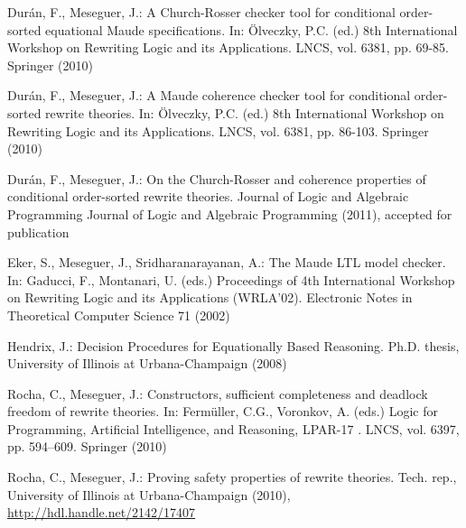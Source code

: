 \documentclass{llncs}
\begin{document}
\begin{thebibliography}{10}
Dur\'an, F., Meseguer, J.: A {C}hurch-{R}osser checker tool for conditional
  order-sorted equational {M}aude specifications. In: \"{O}lveczky, P.C. (ed.)
  8th International Workshop on Rewriting Logic and its Applications. 
  LNCS, vol. 6381, pp. 69-85. Springer (2010)

Dur\'an, F., Meseguer, J.: A {M}aude coherence checker tool for conditional
  order-sorted rewrite theories. In: \"{O}lveczky, P.C. (ed.) 8th International
  Workshop on Rewriting Logic and its Applications. 
  LNCS, vol. 6381, pp. 86-103. Springer (2010)

Dur\'{a}n, F., Meseguer, J.: On the {C}hurch-{R}osser and coherence properties
  of conditional order-sorted rewrite theories. Journal of Logic and Algebraic
  Programming Journal of Logic and Algebraic Programming  (2011), accepted for
  publication

Eker, S., Meseguer, J., Sridharanarayanan, A.: The {M}aude {LTL} model checker.
  In: Gaducci, F., Montanari, U. (eds.) Proceedings of 4th International
  Workshop on Rewriting Logic and its Applications (WRLA'02). Electronic Notes
  in Theoretical Computer Science 71 (2002)

Hendrix, J.: Decision Procedures for Equationally Based Reasoning. Ph.D.
  thesis, University of Illinois at Urbana-Champaign (2008)

Rocha, C., Meseguer, J.: Constructors, sufficient completeness and deadlock
  freedom of rewrite theories. In: Ferm\"uller, C.G., Voronkov, A. (eds.) Logic
  for Programming, Artificial Intelligence, and Reasoning, %
  LPAR-17 . %
  LNCS, vol.
  6397, pp. 594--609. Springer (2010)

Rocha, C., Meseguer, J.: Proving safety properties of rewrite theories. Tech.
  rep., University of Illinois at Urbana-Champaign (2010),
  \url{http://hdl.handle.net/2142/17407}

\end{thebibliography}
\end{document}
